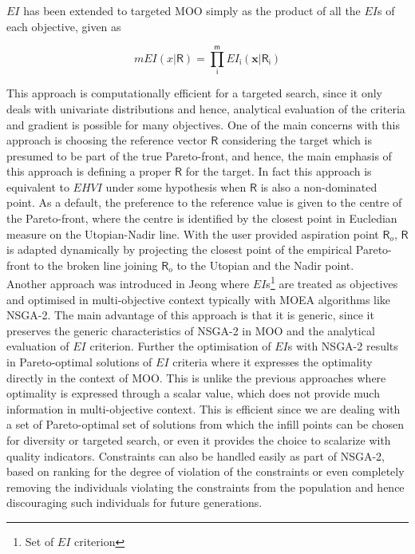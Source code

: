 $EI$ has been extended to targeted MOO simply as the product of all the $EI$s of each objective, given as

\begin{equation}\label{mEI}
mEI(x|\bm{\mathsf{R}}) = \prod_{\mathsf{i}}^{\mathsf{m}} EI_{\mathsf{i}}(\bm x|\mathsf{R}_{\mathsf{i}})
\end{equation}

This approach is computationally efficient for a  targeted search, since it only deals with univariate distributions and hence, analytical evaluation of the criteria and gradient is possible for many objectives. 
One of the main concerns with this approach is choosing the reference vector $\bm{\mathsf{R}}$ considering the target which is presumed to be part of the true Pareto-front, and hence, the main emphasis of this approach is defining a proper $\bm{\mathsf{R}}$ for the target. In fact this approach is equivalent to $EHVI$ under some hypothesis when $\bm{\mathsf{R}}$ is also a non-dominated point. As a default, the preference to the reference value is given to the centre of the Pareto-front, where the centre is identified by the closest point in Eucledian measure on the Utopian-Nadir line. With the user provided aspiration point $\bm{\mathsf{R}}_o$, $\bm{\mathsf{R}}$ is adapted dynamically by projecting the closest point of the empirical Pareto-front to the broken line joining $\bm{\mathsf{R}}_o$ to the Utopian and the Nadir point.\\ 

Another approach was introduced in {\color{red}Jeong} where $EI$s\footnote{Set of $EI$ criterion} are treated as objectives and optimised in multi-objective context  typically with MOEA algorithms like NSGA-2.
The main advantage of this approach is that it is generic, since it preserves the generic characteristics of NSGA-2 in MOO and the analytical evaluation of $EI$ criterion. 
Further the optimisation of $EI$s with NSGA-2 results in Pareto-optimal solutions of $EI$ criteria where it expresses the optimality directly in the context of MOO. 
This is unlike the previous approaches where optimality is expressed through a scalar value, which does not provide much information in multi-objective context. 
This is efficient since we are dealing with a set of Pareto-optimal set of solutions from which the infill points can be chosen for diversity or targeted search, or even it provides the choice to scalarize with quality indicators. 
Constraints can also be handled easily as part of NSGA-2, based on ranking for the degree of violation of the constraints or even completely removing the individuals violating the constraints from the population and hence discouraging such individuals for future generations.\\

